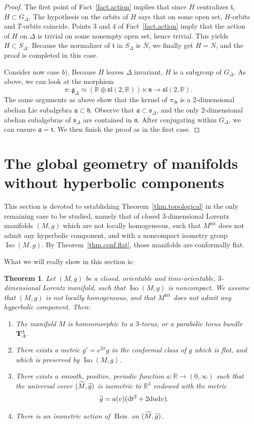 \documentclass[11pt]{article}
\newtheorem{theoreme}[theo]{Theorem}
\theoremstyle{definition}
\numberwithin{equation}{section}
\numberwithin{figure}{section}
\numberwithin{table}{section}
\DeclareMathOperator{\Iso}{Iso}
\newcommand{\mint}{{M^{\intl}}}
\DeclareMathOperator{\intl}{int}
\DeclareMathOperator{\Heis}{Heis}
\newcommand{\tm}{\tilde{{M}}}
\newcommand*\RR{\mathbb{R}}
\newcommand{\lien}{{\mathfrak{n}}}
\newcommand{\lieg}{{\mathfrak{g}}}
\newcommand{\lieh}{{\mathfrak{h}}}
\newcommand{\liea}{{\mathfrak{a}}}
\newcommand{\lies}{{\mathfrak{s}}}
\let\oldtilde\tilde
\renewcommand*\tilde[1]{\mathchoice{\widetilde{#1}}{\widetilde{#1}}{\widetilde{#1}}{\oldtilde{#1}}}
\newcommand*{\dd}{\mathrm{d}}
\newcommand*{\dt}{\dd t}
\newcommand*{\du}{\dd u}
\newcommand*{\dv}{\dd v}
\begin{document}
\begin{proof}
The first point of Fact~\ref{fact.action} implies that since $H$ centralizes $\mathfrak{t}$, $H \subset G_{\Delta}$. The hypothesis on the orbits of $H$ says that on some open set, $H$-orbits and $T$-orbits coincide. Points $3$ and $4$ of Fact~\ref{fact.action} imply that the action of $H$ on $\Delta$ is trivial on some nonempty open set, hence trivial. This yields $H \subset S_{\Delta}$. Because the normalizer of $\mathfrak{t}$ in $S_{\Delta}$ is $N$, we finally get $H=N$, and the proof is completed in this case.



Consider now case $b)$. Because $H$ leaves $\Delta$ invariant, $H$ is a subgroup of $G_{\Delta}$. As above, we can look at the morphism
\[
\pi: \lieg_{\Delta} \simeq (\RR \oplus \mathfrak{sl}(2,\RR)) \ltimes \lien \to \mathfrak{sl}(2,\RR).
\]
The same arguments as above show that the kernel of $\pi_{| \lieh}$ is a $2$-dimensional abelian Lie subalgebra $\liea \subset \lieh$. Observe that $\liea \subset \lies_{\Delta}$, and the only $2$-dimensional abelian subalgebras of $\lies_{\Delta}$ are contained in $\lien$. After conjugating within $G_{\Delta}$, we can ensure $\liea={\mathfrak t}$. We then finish the proof as in the first case.
\end{proof}



\section{The global geometry of manifolds without hyperbolic components}\label{sec.global}
This section is devoted to establishing Theorem~\ref{thm.topological} in the only remaining case to be studied, namely that of closed $3$-dimensional Lorentz manifolds $(M,g)$ which are not locally homogeneous, such that $\mint$ does not admit any hyperbolic component, and with a noncompact isometry group $\Iso(M,g)$. By Theorem~\ref{thm.conf.flat}, those manifolds are conformally flat.

What we will really show in this section is:
\begin{theoreme}\label{th.theoplat}
Let $(M,g)$ be a closed, orientable and time-orientable, $3$-dimensional Lorentz manifold, such that $\Iso(M,g)$ is noncompact. We assume that $(M,g)$ is not locally homogeneous, and that $\mint$ does not admit any hyperbolic component. Then:
\begin{enumerate}
\item \label{8.1.1} The manifold $M$ is homeomorphic to a $3$-torus, or a parabolic torus bundle~${\bf T}_A^3$.
\item \label{8.1.2} There exists a metric $g'=e^{2\sigma}g$ in the conformal class of $g$ which is flat, and which is preserved by $\Iso(M,g)$.
\item \label{8.1.3} There exists a smooth, positive, periodic function $a:\RR \to (0,\infty)$ such that the universal cover $(\tilde{M},{\tilde{g}})$ is isometric to $\RR^3$ endowed with the metric
\[
{\tilde{g}}=a(v)(\dt^2+2\du\dv).
\]
\item \label{8.1.4} There is an isometric action of $\Heis$ on $(\tm,\tilde{g})$.
\end{enumerate}
\end{theoreme}
\end{document}
